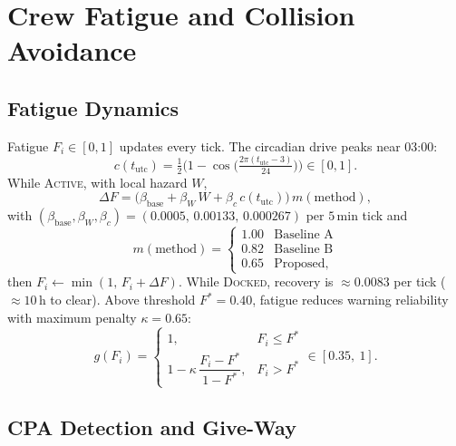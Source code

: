 \documentclass[cameraready]{Interspeech}
\begin{document}
\section{Crew Fatigue and Collision Avoidance}
\label{sec:fatigue}
\label{sec:avoidance}

\subsection{Fatigue Dynamics}

Fatigue $F_i \in [0,1]$ updates every tick. The circadian drive peaks near 03:00:
\begin{equation*}
  c(t_{\text{utc}}) = \tfrac12\Big(1 - \cos\big(\tfrac{2\pi (t_{\text{utc}} - 3)}{24}\big)\Big) \in [0,1].
\end{equation*}
While \textsc{Active}, with local hazard $W$,
\begin{equation}
  \Delta F = \big(\beta_{\text{base}} + \beta_W\,W + \beta_c\,c(t_{\text{utc}})\big)\,m(\text{method}),
  \label{eq:dF}
\end{equation}
with $(\beta_{\text{base}}, \beta_W, \beta_c) = (0.0005,\,0.00133,\,0.000267)$ per $5$\,min tick and
\begin{equation}
  m(\text{method}) =
  \begin{cases}
  1.00 & \text{Baseline A}\\
  0.82 & \text{Baseline B}\\
  0.65 & \text{Proposed},
  \end{cases}
  \label{eq:m}
\end{equation}
then $F_i \leftarrow \min(1,\,F_i + \Delta F)$. While \textsc{Docked}, recovery is ${\approx}0.0083$ per tick (${\approx}10$\,h to clear). Above threshold $F^\ast = 0.40$, fatigue reduces warning reliability with maximum penalty $\kappa = 0.65$:
\begin{equation}
  g(F_i) =
  \begin{cases}
  1, & F_i \le F^\ast\\[4pt]
  1 - \kappa\,\dfrac{F_i - F^\ast}{1 - F^\ast}, & F_i > F^\ast
  \end{cases}
  \in [0.35,\ 1].
  \label{eq:gF}
\end{equation}

\subsection{CPA Detection and Give-Way}
\end{document}
